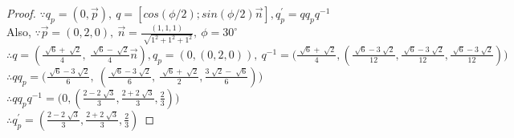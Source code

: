 \documentclass[12pt]{article}
\begin{document}
\begin{proof}


$\because q_p = (0, \vec{p}),\  q = [cos(\phi / 2); sin(\phi /2)\vec{n}], q^{'}_p = qq_pq^{-1}$\\[5pt]

Also, $\because  \vec{p} = (0, 2, 0), \ \vec{n}= \frac {(1, 1, 1)} { \sqrt[]{1^2 + 1^2 + 1^2}},  \ \phi = 30^\circ $\\[5pt]

$\therefore q = (\frac{\sqrt[]{6} + \sqrt[]{2}}{4},\  \frac{\sqrt[]{6} - \sqrt[]{2}}{4}\vec{n}) ,  q_p = (0, (0, 2, 0)), \ q^{-1} = \big(\frac{\sqrt[]{6} + \sqrt[]{2}}{4}, 
(\frac{\sqrt[]{6} - 3\sqrt[]{2}}{12}, \frac{\sqrt[]{6} - 3\sqrt[]{2}}{12}, \frac{\sqrt[]{6} - 3\sqrt[]{2}}{12})\big)$\\[5pt]

$\therefore qq_p=\big(\frac{\sqrt[]{6} - 3\sqrt[]{2}}{6}, \ (\frac{\sqrt[]{6} - 3\sqrt[]{2}}{6}, \ \frac{\sqrt[]{6} + \sqrt[]{2}}{2}  , \frac{3\sqrt[]{2} - \sqrt[]{6}}{6})\big)$\\[5pt]

$\therefore qq_pq^{-1} = \big(0, (\frac{2 - 2\sqrt[]{3}}{3}, \frac{2 + 2\sqrt[]{3}}{3}, \frac{2}{3})\big)$\\[5pt]

$\therefore q^{'}_p = (\frac{2 - 2\sqrt[]{3}}{3}, \frac{2 + 2\sqrt[]{3}}{3}, \frac{2}{3})$
\end{proof}
 
\end{document}
